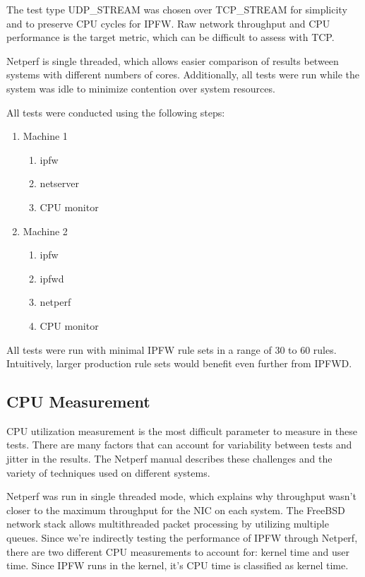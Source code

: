 \documentclass[journal]{IEEEtran}
\begin{document}
  The test type UDP\_STREAM was chosen over TCP\_STREAM for simplicity and to
  preserve CPU cycles for IPFW. Raw network throughput and CPU performance is
  the target metric, which can be difficult to assess with TCP.

  Netperf is single threaded, which allows easier comparison of results between
  systems with different numbers of cores. Additionally, all tests were run
  while the system was idle to minimize contention over system resources. 

  All tests were conducted using the following steps:
  \begin{enumerate}
      \item Machine 1
      \begin{enumerate}
          \item ipfw
          \item netserver
          \item CPU monitor
      \end{enumerate}
      \item Machine 2
      \begin{enumerate}
          \item ipfw
          \item ipfwd
          \item netperf
          \item CPU monitor
      \end{enumerate}
  \end{enumerate}

  All tests were run with minimal IPFW rule sets in a range of 30 to 60 rules.
  Intuitively, larger production rule sets would benefit even further from
  IPFWD.


  \subsection{CPU Measurement}

  CPU utilization measurement is the most difficult parameter to measure in
  these tests. There are many factors that can account for variability between
  tests and jitter in the results. The Netperf manual describes these
  challenges and the variety of techniques used on different systems. 

  Netperf was run in single threaded mode, which explains why throughput wasn't
  closer to the maximum throughput for the NIC on each system. The FreeBSD
  network stack allows multithreaded packet processing by utilizing multiple
  queues. Since we're indirectly testing the performance of IPFW through
  Netperf, there are two different CPU measurements to account for: kernel time
  and user time. Since IPFW runs in the kernel, it's CPU time is classified as
  kernel time.
\end{document}
